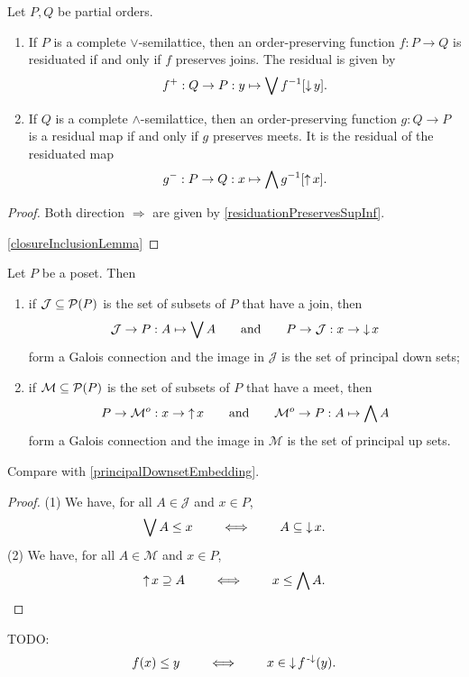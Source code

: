\begin{proposition} \label{GaloisConnectionLatticePreservation}
Let $P, Q$ be partial orders.
\begin{enumerate}
\item If $P$ is a complete $\vee$-semilattice, then an order-preserving function $f: P\to Q$ is residuated \textup{if and only if} $f$ preserves joins. The residual is given by
\[ f^+: Q\to P: y\mapsto \bigvee f^{-1}[\operatorname{\downarrow} y]. \]
\item If $Q$ is a complete $\wedge$-semilattice, then an order-preserving function $g: Q\to P$ is a residual map \textup{if and only if} $g$ preserves meets. It is the residual of the residuated map
\[ g^-: P\to Q: x\mapsto \bigwedge g^{-1}[\operatorname{\uparrow} x]. \]
\end{enumerate}
\end{proposition}
\begin{proof}
Both direction $\Rightarrow$ are given by \ref{residuationPreservesSupInf}.

\ref{closureInclusionLemma}
\end{proof}



\begin{proposition} \label{upsetDownsetConnections}
Let $P$ be a poset. Then
\begin{enumerate}
\item if $\mathcal{J}\subseteq \operatorname{\mathcal{P}}(P)$ is the set of subsets of $P$ that have a join, then
\[ \mathcal{J} \to P: A\mapsto \bigvee A \qquad\text{and}\qquad P\to \mathcal{J}: x\to \operatorname{\downarrow} x \]
form a Galois connection and the image in $\mathcal{J}$ is the set of principal down sets;
\item if $\mathcal{M}\subseteq \operatorname{\mathcal{P}}(P)$ is the set of subsets of $P$ that have a meet, then
\[ P\to \mathcal{M}^o: x\to \operatorname{\uparrow} x \qquad\text{and}\qquad \mathcal{M}^o \to P: A\mapsto \bigwedge A \]
form a Galois connection and the image in $\mathcal{M}$ is the set of principal up sets. 
\end{enumerate}
\end{proposition}
Compare with \ref{principalDownsetEmbedding}.
\begin{proof}
(1) We have, for all $A\in \mathcal{J}$ and $x\in P$,
\[ \bigvee A \leq x \qquad \iff\qquad A\subseteq \operatorname{\downarrow} x. \]
(2) We have, for all $A\in \mathcal{M}$ and $x\in P$,
\[ \operatorname{\uparrow} x \supseteq A \qquad \iff\qquad x\leq \bigwedge A. \]
\end{proof}

TODO:
\[ f(x) \leq y \qquad\iff\qquad x\in \operatorname{\downarrow} f^{{\text{\hspace{0.15em}-}\downarrow}}(y). \]

